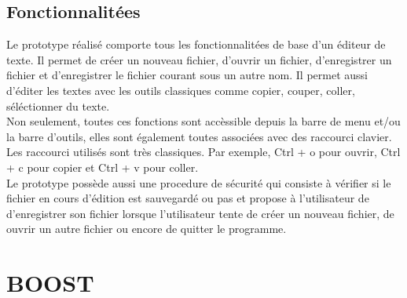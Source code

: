 \subsection*{Fonctionnalitées}
Le prototype réalisé comporte tous les fonctionnalitées de base d'un
éditeur de texte. Il permet de créer un nouveau fichier, d'ouvrir un
fichier, d'enregistrer un fichier et d'enregistrer le fichier courant
sous un autre nom. Il permet aussi d'éditer les textes avec les outils
classiques comme copier, couper, coller, séléctionner du texte.
\\ Non seulement, toutes ces fonctions sont accèssible depuis la barre
de menu et/ou la barre d'outils, elles sont également toutes associées
avec des raccourci clavier. Les raccourci utilisés sont très
classiques. Par exemple, Ctrl + o pour ouvrir, Ctrl + c pour copier et
Ctrl + v pour coller.\\ Le prototype possède aussi une procedure de
sécurité qui consiste à vérifier si le fichier en cours d'édition est
sauvegardé ou pas et propose à l'utilisateur de d'enregistrer son
fichier lorsque l'utilisateur tente de créer un nouveau fichier, de
ouvrir un autre fichier ou encore de quitter le programme.




\subsection*{}


\section{BOOST}

\subsection*{}

\subsection*{}

\subsection*
{}
